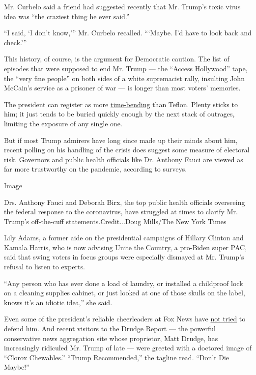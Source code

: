 Mr. Curbelo said a friend had suggested recently that Mr. Trump's toxic
virus idea was ``the craziest thing he ever said.''

``I said, `I don't know,''' Mr. Curbelo recalled. ```Maybe. I'd have to
look back and check.'''

This history, of course, is the argument for Democratic caution. The
list of episodes that were supposed to end Mr. Trump --- the ``Access
Hollywood'' tape, the ``very fine people'' on both sides of a white
supremacist rally, insulting John McCain's service as a prisoner of war
--- is longer than most voters' memories.

The president can register as more
\href{https://www.nytimes.com/2017/12/29/us/politics/trump-news-overload.html}{time-bending}
than Teflon. Plenty sticks to him; it just tends to be buried quickly
enough by the next stack of outrages, limiting the exposure of any
single one.

But if most Trump admirers have long since made up their minds about
him, recent polling on his handling of the crisis does suggest some
measure of electoral risk. Governors and public health officials like
Dr. Anthony Fauci are viewed as far more trustworthy on the pandemic,
according to surveys.

Image

Drs. Anthony Fauci and Deborah Birx, the top public health officials
overseeing the federal response to the coronavirus, have struggled at
times to clarify Mr. Trump's off-the-cuff statements.Credit...Doug
Mills/The New York Times

Lily Adams, a former aide on the presidential campaigns of Hillary
Clinton and Kamala Harris, who is now advising Unite the Country, a
pro-Biden super PAC, said that swing voters in focus groups were
especially dismayed at Mr. Trump's refusal to listen to experts.

``Any person who has ever done a load of laundry, or installed a
childproof lock on a cleaning supplies cabinet, or just looked at one of
those skulls on the label, knows it's an idiotic idea,'' she said.

Even some of the president's reliable cheerleaders at Fox News have
\href{https://www.nytimes.com/2020/04/24/business/media/virus-fox-trump-disinfectant.html}{not
tried} to defend him. And recent visitors to the Drudge Report --- the
powerful conservative news aggregation site whose proprietor, Matt
Drudge, has increasingly ridiculed Mr. Trump of late --- were greeted
with a doctored image of ``Clorox Chewables.'' ``Trump Recommended,''
the tagline read. ``Don't Die Maybe!''

